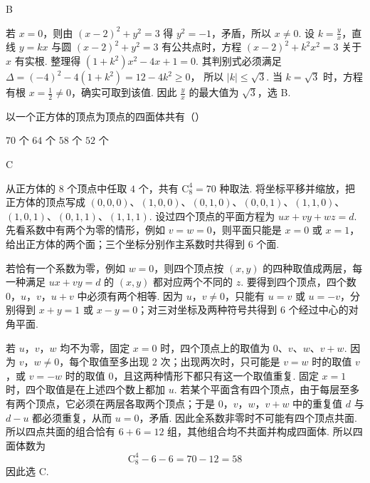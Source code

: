 \documentclass[UTF8,a4paper,oneside,11pt]{ctexbook}
\begin{document}
\begin{answer}
B
\end{answer}

\begin{solution}
若 \(x=0\)，则由 \((x-2)^2+y^2=3\) 得 \(y^2=-1\)，矛盾，所以 \(x\ne0\). 设 \(k=\frac{y}{x}\)，直线 \(y=kx\) 与圆 \((x-2)^2+y^2=3\) 有公共点时，方程
\((x-2)^2+k^2x^2=3\)
关于 \(x\) 有实根. 整理得
\((1+k^2)x^2-4x+1=0\).
其判别式必须满足
\(\Delta=(-4)^2-4(1+k^2)=12-4k^2\geqslant0\)，
所以 \(|k|\leqslant\sqrt{3}\). 当 \(k=\sqrt{3}\) 时，方程有根 \(x=\frac12\ne0\)，确实可取到该值. 因此 \(\frac{y}{x}\) 的最大值为 \(\sqrt{3}\)，选 B.
\end{solution}

\begin{problem}
以一个正方体的顶点为顶点的四面体共有（\quad）

\choices
    {\(70\) 个}
    {\(64\) 个}
    {\(58\) 个}
    {\(52\) 个}
\end{problem}

\begin{answer}
C
\end{answer}

\begin{solution}
从正方体的 \(8\) 个顶点中任取 \(4\) 个，共有
\(\mathrm C_8^4=70\)
种取法. 将坐标平移并缩放，把正方体的顶点写成 \((0,0,0)\)、\((1,0,0)\)、\((0,1,0)\)、\((0,0,1)\)、\((1,1,0)\)、\((1,0,1)\)、\((0,1,1)\)、\((1,1,1)\). 设过四个顶点的平面方程为 \(ux+vy+wz=d\). 先看系数中有两个为零的情形，例如 \(v=w=0\)，则平面只能是 \(x=0\) 或 \(x=1\)，给出正方体的两个面；三个坐标分别作主系数时共得到 \(6\) 个面.

若恰有一个系数为零，例如 \(w=0\)，则四个顶点按 \((x,y)\) 的四种取值成两层，每一种满足 \(ux+vy=d\) 的 \((x,y)\) 都对应两个不同的 \(z\). 要得到四个顶点，四个数 \(0\)，\(u\)，\(v\)，\(u+v\) 中必须有两个相等. 因为 \(u\)，\(v\ne0\)，只能有 \(u=v\) 或 \(u=-v\)，分别得到 \(x+y=1\) 或 \(x-y=0\)；对三对坐标及两种符号共得到 \(6\) 个经过中心的对角平面.

若 \(u\)，\(v\)，\(w\) 均不为零，固定 \(x=0\) 时，四个顶点上的取值为
\(0\)、\(v\)、\(w\)、\(v+w\).
因为 \(v\)，\(w\ne0\)，每个取值至多出现 \(2\) 次；出现两次时，只可能是 \(v=w\) 时的取值 \(v\)，或 \(v=-w\) 时的取值 \(0\)，且这两种情形下都只有这一个取值重复. 固定 \(x=1\) 时，四个取值是在上述四个数上都加 \(u\). 若某个平面含有四个顶点，由于每层至多有两个顶点，它必须在两层各取两个顶点；于是 \(0\)，\(v\)，\(w\)，\(v+w\) 中的重复值 \(d\) 与 \(d-u\) 都必须重复，从而 \(u=0\)，矛盾. 因此全系数非零时不可能有四个顶点共面. 所以四点共面的组合恰有 \(6+6=12\) 组，其他组合均不共面并构成四面体. 所以四面体数为
\[
\mathrm C_8^4-6-6=70-12=58
\]
因此选 C.
\end{solution}
\end{document}
